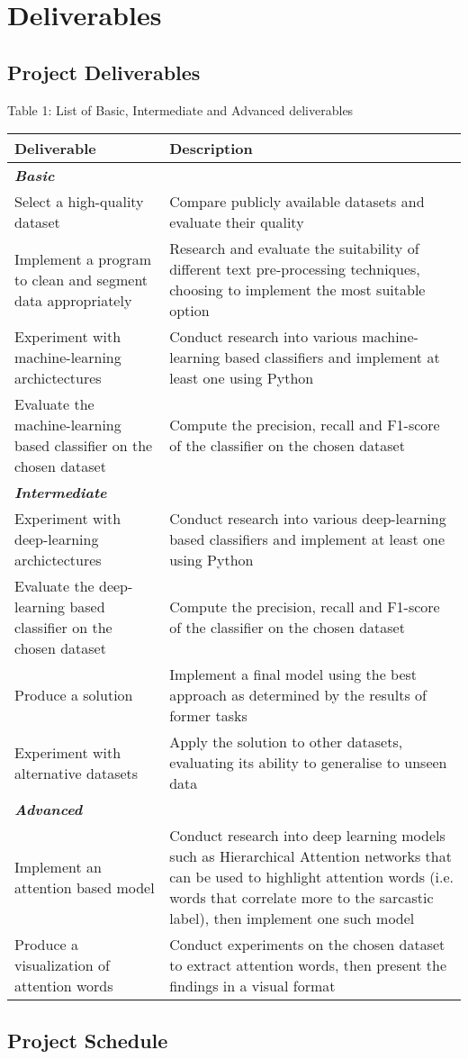 \documentclass[12pt,a4paper]{article}
\begin{document}
\newpage

\section{Deliverables}
\subsection{Project Deliverables}
\begin{center}
	Table 1: List of Basic, Intermediate and Advanced deliverables
\end{center}
\begin{tabular}{p{5cm}p{10cm}}
	\hline
	\textbf{Deliverable} & \textbf{Description}\\
	\hline\hline
	\multicolumn{2}{l}{\textit{\textbf{Basic}}} \\
	\hline \hline
	Select a high-quality dataset   &  Compare publicly available datasets and evaluate their quality\\
	\hline
	Implement a program to clean and segment data appropriately   & Research and evaluate the suitability of different text pre-processing techniques, choosing to implement the most suitable option\\
	\hline
	Experiment with machine-learning archictectures & Conduct research into various machine-learning based classifiers and implement at least one using Python\\
	\hline
	Evaluate the machine-learning based classifier on the chosen dataset & Compute the precision, recall and F1-score of the classifier on the chosen dataset\\
	\hline \hline
	\multicolumn{2}{l}{\textit{\textbf{Intermediate}}} \\
	\hline \hline
	Experiment with deep-learning archictectures & Conduct research into various deep-learning based classifiers and implement at least one using Python\\
	\hline
	Evaluate the deep-learning based classifier on the chosen dataset & Compute the precision, recall and F1-score of the classifier on the chosen dataset\\
	\hline
	Produce a solution & Implement a final model using the best approach as determined by the results of former tasks\\
	\hline
	Experiment with alternative datasets & Apply the solution to other datasets, evaluating its ability to generalise to unseen data \\
	\hline \hline
	\multicolumn{2}{l}{\textit{\textbf{Advanced}}} \\
	\hline \hline	
	Implement an attention based model &   Conduct research into deep learning models such as Hierarchical Attention networks that can be used to highlight attention words (i.e. words that correlate more to the sarcastic label), then implement one such model\\
	\hline
	Produce a visualization of attention words & Conduct experiments on the chosen dataset to extract attention words, then present the findings in a visual format \\
	\hline
\end{tabular}

\subsection{Project Schedule}


\newpage
\end{document}
